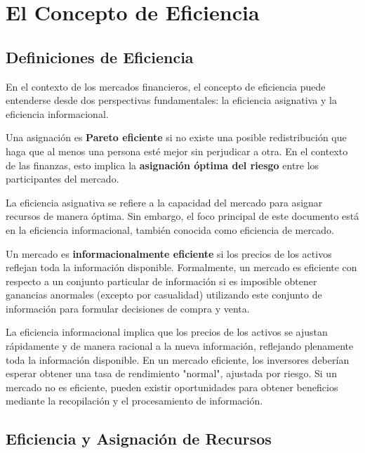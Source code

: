 \section{El Concepto de Eficiencia}

\subsection{Definiciones de Eficiencia}

En el contexto de los mercados financieros, el concepto de eficiencia puede entenderse desde dos perspectivas fundamentales: la eficiencia asignativa y la eficiencia informacional.

\begin{definicion}
Una asignación es \textbf{Pareto eficiente} si no existe una posible redistribución que haga que al menos una persona esté mejor sin perjudicar a otra. En el contexto de las finanzas, esto implica la \textbf{asignación óptima del riesgo} entre los participantes del mercado.
\end{definicion}

La eficiencia asignativa se refiere a la capacidad del mercado para asignar recursos de manera óptima. Sin embargo, el foco principal de este documento está en la eficiencia informacional, también conocida como eficiencia de mercado.

\begin{definicion}
Un mercado es \textbf{informacionalmente eficiente} si los precios de los activos reflejan toda la información disponible. Formalmente, un mercado es eficiente con respecto a un conjunto particular de información si es imposible obtener ganancias anormales (excepto por casualidad) utilizando este conjunto de información para formular decisiones de compra y venta.
\end{definicion}

La eficiencia informacional implica que los precios de los activos se ajustan rápidamente y de manera racional a la nueva información, reflejando plenamente toda la información disponible. En un mercado eficiente, los inversores deberían esperar obtener una tasa de rendimiento "normal", ajustada por riesgo. Si un mercado no es eficiente, pueden existir oportunidades para obtener beneficios mediante la recopilación y el procesamiento de información.

\subsection{Eficiencia y Asignación de Recursos}

